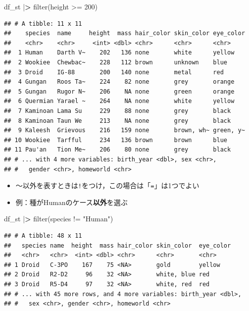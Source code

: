 \documentclass[
  xelatex,ja=standard, b5paper]{bxjsbook}
\newenvironment{Shaded}{\begin{snugshade}}{\end{snugshade}}
\newcommand{\DecValTok}[1]{\textcolor[rgb]{0.00,0.00,0.81}{#1}}
\newcommand{\ErrorTok}[1]{\textcolor[rgb]{0.64,0.00,0.00}{\textbf{#1}}}
\newcommand{\FunctionTok}[1]{\textcolor[rgb]{0.00,0.00,0.00}{#1}}
\newcommand{\NormalTok}[1]{#1}
\newcommand{\SpecialCharTok}[1]{\textcolor[rgb]{0.00,0.00,0.00}{#1}}
\newcommand{\StringTok}[1]{\textcolor[rgb]{0.31,0.60,0.02}{#1}}
\providecommand{\tightlist}{%
  \setlength{\itemsep}{0pt}\setlength{\parskip}{0pt}}
\begin{document}
\begin{Shaded}
\begin{Highlighting}[]
\NormalTok{df\_st }\SpecialCharTok{|}\ErrorTok{\textgreater{}} 
  \FunctionTok{filter}\NormalTok{(height }\SpecialCharTok{\textgreater{}=} \DecValTok{200}\NormalTok{)}
\end{Highlighting}
\end{Shaded}

\begin{verbatim}
## # A tibble: 11 x 11
##    species  name     height  mass hair_color skin_color eye_color
##    <chr>    <chr>     <int> <dbl> <chr>      <chr>      <chr>    
##  1 Human    Darth V~    202   136 none       white      yellow   
##  2 Wookiee  Chewbac~    228   112 brown      unknown    blue     
##  3 Droid    IG-88       200   140 none       metal      red      
##  4 Gungan   Roos Ta~    224    82 none       grey       orange   
##  5 Gungan   Rugor N~    206    NA none       green      orange   
##  6 Quermian Yarael ~    264    NA none       white      yellow   
##  7 Kaminoan Lama Su     229    88 none       grey       black    
##  8 Kaminoan Taun We     213    NA none       grey       black    
##  9 Kaleesh  Grievous    216   159 none       brown, wh~ green, y~
## 10 Wookiee  Tarfful     234   136 brown      brown      blue     
## 11 Pau'an   Tion Me~    206    80 none       grey       black    
## # ... with 4 more variables: birth_year <dbl>, sex <chr>,
## #   gender <chr>, homeworld <chr>
\end{verbatim}

\begin{itemize}
\tightlist
\item
  ～以外を表すときは\texttt{!}をつけ，この場合は「\texttt{=}」は1つでよい
\item
  例：種がHumanのケース\textbf{以外}を選ぶ
\end{itemize}

\begin{Shaded}
\begin{Highlighting}[]
\NormalTok{df\_st }\SpecialCharTok{|}\ErrorTok{\textgreater{}} 
  \FunctionTok{filter}\NormalTok{(species }\SpecialCharTok{!=} \StringTok{"Human"}\NormalTok{)}
\end{Highlighting}
\end{Shaded}

\begin{verbatim}
## # A tibble: 48 x 11
##   species name  height  mass hair_color skin_color  eye_color
##   <chr>   <chr>  <int> <dbl> <chr>      <chr>       <chr>    
## 1 Droid   C-3PO    167    75 <NA>       gold        yellow   
## 2 Droid   R2-D2     96    32 <NA>       white, blue red      
## 3 Droid   R5-D4     97    32 <NA>       white, red  red      
## # ... with 45 more rows, and 4 more variables: birth_year <dbl>,
## #   sex <chr>, gender <chr>, homeworld <chr>
\end{verbatim}
\end{document}
